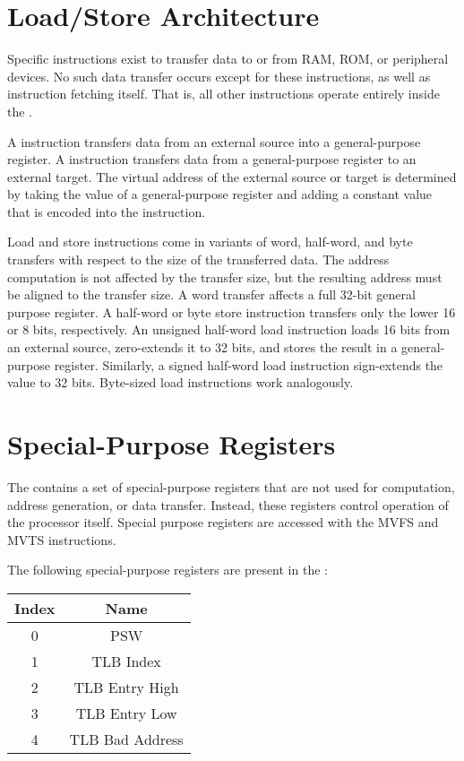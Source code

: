 \section{Load/Store Architecture}

Specific instructions exist to transfer data to or from RAM, ROM, or peripheral devices. No such data transfer occurs except for these instructions, as well as instruction fetching itself. That is, all other instructions operate entirely inside the \eco.

A  instruction transfers data from an external source into a general-purpose register. A  instruction transfers data from a general-purpose register to an external target. The virtual address of the external source or target is determined by taking the value of a general-purpose register and adding a constant value that is encoded into the instruction.

Load and store instructions come in variants of word, half-word, and byte transfers with respect to the size of the transferred data. The address computation is not affected by the transfer size, but the resulting address must be aligned to the transfer size. A word transfer affects a full 32-bit general purpose register. A half-word or byte store instruction transfers only the lower 16 or 8 bits, respectively. An unsigned half-word load instruction loads 16 bits from an external source, zero-extends it to 32 bits, and stores the result in a general-purpose register. Similarly, a signed half-word load instruction sign-extends the value to 32 bits. Byte-sized load instructions work analogously.

\section{Special-Purpose Registers}

The \eco contains a set of special-purpose registers that are not used for computation, address generation, or data transfer. Instead, these registers control operation of the processor itself. Special purpose registers are accessed with the MVFS and MVTS instructions.

The following special-purpose registers are present in the \ecox:

\begin{tabular}{|c|c|}
\hline
Index & Name\\
\hline
0 & PSW\\
\hline
1 & TLB Index\\
\hline
2 & TLB Entry High\\
\hline
3 & TLB Entry Low\\
\hline
4 & TLB Bad Address\\
\hline
\end{tabular}

